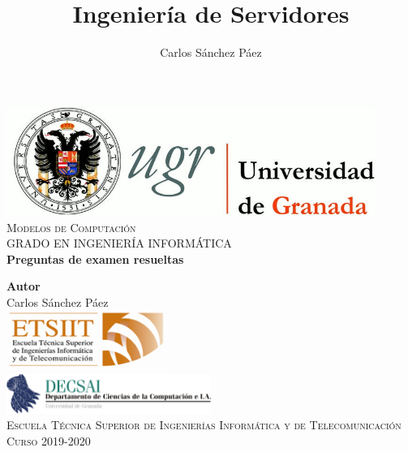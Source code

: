 \documentclass[12pt,spanish]{article}
\title{Ingeniería de Servidores}
\author{Carlos Sánchez Páez}
\begin{document}
\lstset{columns=fullflexible,basicstyle=\ttfamily}


\begin{titlepage}

 \newlength{\centeroffset}
 \setlength{\centeroffset}{-0.5\oddsidemargin}
 \addtolength{\centeroffset}{0.5\evensidemargin}
 \thispagestyle{empty}

 \noindent\hspace*{\centeroffset}
 \begin{minipage}{\textwidth}

  \centering
  \includegraphics[width=0.9\textwidth]{logo_ugr.jpg}\\[1.4cm]

  \textsc{ \Large Modelos de Computación\\[0.2cm]}
  \textsc{GRADO EN INGENIERÍA INFORMÁTICA}\\[1cm]

  {\Huge\bfseries Preguntas de examen resueltas\\}
 \end{minipage}

 \vspace{1.5cm}
 \noindent\hspace*{\centeroffset}
 \begin{minipage}{\textwidth}
  \centering

  \textbf{Autor}\\ {Carlos Sánchez Páez}\\[4ex]
  \includegraphics[width=0.4\textwidth]{etsiit_logo.png}\\[0.1cm]
  \vspace{1.5cm}
  \includegraphics[width=0.5\textwidth]{decsai.jpg}\\[0.1cm]
  \vspace{1cm}
  \textsc{Escuela Técnica Superior de Ingenierías Informática y de Telecomunicación}\\
  \vspace{1cm}
  \textsc{Curso 2019-2020}
 \end{minipage}
\end{titlepage}
\thispagestyle{empty}
\newpage
\tableofcontents{}
\newpage
\listoffigures
\thispagestyle{empty}
\newpage
\end{document}
